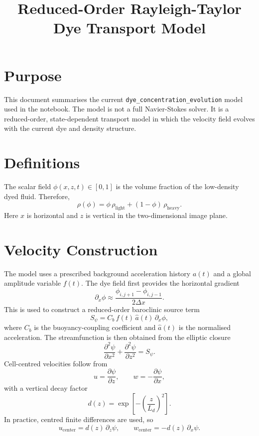 \documentclass[10pt,twocolumn]{article}
\title{Reduced-Order Rayleigh-Taylor Dye Transport Model}
\author{}
\date{}
\begin{document}
\maketitle
\vspace{-2.0em}
\small

\section*{Purpose}
This document summarises the current \texttt{dye\_concentration\_evolution}
model used in the notebook. The model is not a full Navier-Stokes solver. It
is a reduced-order, state-dependent transport model in which the velocity field
evolves with the current dye and density structure.

\section*{Definitions}
The scalar field $\phi(x,z,t)\in[0,1]$ is the volume fraction of the low-density
dyed fluid. Therefore,
\begin{equation}
  \rho(\phi)=\phi\,\rho_{\text{light}}+(1-\phi)\,\rho_{\text{heavy}}.
\end{equation}
Here $x$ is horizontal and $z$ is vertical in the two-dimensional image plane.

\section*{Velocity Construction}
The model uses a prescribed background acceleration history $a(t)$ and a global
amplitude variable $f(t)$. The dye field first provides
the horizontal gradient
\begin{equation}
  \partial_x \phi \approx \frac{\phi_{i,j+1}-\phi_{i,j-1}}{2\Delta x}.
\end{equation}
This is used to construct a reduced-order baroclinic source term
\begin{equation}
  S_\psi = C_b\,f(t)\,\hat a(t)\,\partial_x \phi,
\end{equation}
where $C_b$ is the buoyancy-coupling coefficient and $\hat a(t)$ is the
normalised acceleration. The streamfunction is then obtained from the elliptic
closure
\begin{equation}
  \frac{\partial^2\psi}{\partial x^2}+\frac{\partial^2\psi}{\partial z^2}=S_\psi.
\end{equation}
Cell-centred velocities follow from
\begin{equation}
  u=\frac{\partial\psi}{\partial z}, \qquad
  w=-\frac{\partial\psi}{\partial x},
\end{equation}
with a vertical decay factor
\begin{equation}
  d(z)=\exp\left[-\left(\frac{z}{L_d}\right)^2\right].
\end{equation}
In practice, centred finite differences are used, so
\begin{equation}
  u_{\text{center}}=d(z)\,\partial_z\psi, \qquad
  w_{\text{center}}=-d(z)\,\partial_x\psi.
\end{equation}
\end{document}

